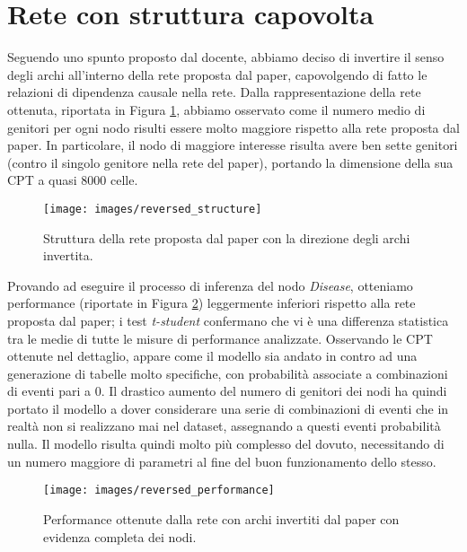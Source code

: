 \section{Rete con struttura capovolta}
Seguendo uno spunto proposto dal docente, abbiamo deciso di invertire il senso degli archi all'interno della rete proposta dal paper, capovolgendo di fatto le relazioni di dipendenza causale nella rete. Dalla rappresentazione della rete ottenuta, riportata in Figura \ref{fig:reversedstructure}, abbiamo osservato come il numero medio di genitori per ogni nodo risulti essere molto maggiore rispetto alla rete proposta dal paper. In particolare, il nodo di maggiore interesse risulta avere ben sette genitori (contro il singolo genitore nella rete del paper), portando la dimensione della sua CPT a quasi $8000$ celle. 
\begin{figure}
	\centering
	\texttt{[image: images/reversed\_structure]}
	\caption{Struttura della rete proposta dal paper con la direzione degli archi invertita.}
	\label{fig:reversedstructure}
\end{figure}
Provando ad eseguire il processo di inferenza del nodo \textit{Disease}, otteniamo performance (riportate in Figura \ref{fig:reversedperformance}) leggermente inferiori rispetto alla rete proposta dal paper; i test \textit{t-student} confermano che vi è una differenza statistica tra le medie di tutte le misure di performance analizzate. Osservando le CPT ottenute nel dettaglio, appare come il modello sia andato in contro ad una generazione di tabelle molto specifiche, con probabilità associate a combinazioni di eventi pari a $0$. Il drastico aumento del numero di genitori dei nodi ha quindi portato il modello a dover considerare una serie di combinazioni di eventi che in realtà non si realizzano mai nel dataset, assegnando a questi eventi probabilità nulla. Il modello risulta quindi molto più complesso del dovuto, necessitando di un numero maggiore di parametri al fine del buon funzionamento dello stesso.
\begin{figure}
	\centering
	\texttt{[image: images/reversed\_performance]}
	\caption{Performance ottenute dalla rete con archi invertiti dal paper con evidenza completa dei nodi.}
	\label{fig:reversedperformance}
\end{figure}


